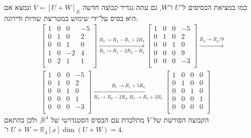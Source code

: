 \documentclass[a4paper]{article}
\def\RR{\mathbb{R}}
\begin{document}
כמו במציאת הבסיסים ל־$U$ ו־$W$,
גם עתה נגדיר קבוצה חדשה $V = {[U + W]}_E$ ונמצא אם היא בסיס על־ידי
שימוש במטריצת שורות ודירוגה:
\begin{align*}
	& \begin{bmatrix}
		1 & 0 & 0 & -5 \\
		0 & 1 & 0 & 2 \\
		0 & 0 & 1 & 0 \\
		1 & 0 & -2 & 4 \\
		0 & 2 & 1 & 1 \\
	\end{bmatrix}
	\xrightarrow[R_5 \to R_5 - 2R_2 - R_3]{R_4 \to R_4 - R_1 + 2R_3}
	\begin{bmatrix}
		1 & 0 & 0 & -5 \\
		0 & 1 & 0 & 2 \\
		0 & 0 & 1 & 0 \\
		0 & 0 & 0 & 9 \\
		0 & 0 & 0 & -3 \\
	\end{bmatrix}
	\xrightarrow{R_4 \to R_4 / 9} \\
	& \begin{bmatrix}
		1 & 0 & 0 & -5 \\
		0 & 1 & 0 & 2 \\
		0 & 0 & 1 & 0 \\
		0 & 0 & 0 & 1 \\
		0 & 0 & 0 & -3 \\
	\end{bmatrix}
	\xrightarrow[R_2 \to R_2 - 2R_4, R_5 \to R_5 + 3R_1]{R_1 \to R_1 + 5R_4}
	\begin{bmatrix}
		1 & 0 & 0 & 0 \\
		0 & 1 & 0 & 0 \\
		0 & 0 & 1 & 0 \\
		0 & 0 & 0 & 1 \\
		0 & 0 & 0 & 0 \\
	\end{bmatrix}
\end{align*}
הקבוצה הפורשת של $V$ מתלכדת עם הבסיס הסטנדרטי של $\RR^4$,
ולכן בהתאם $U + W = \RR_4[x]$ ו־$\dim(U + W) = 4$.
\end{document}
